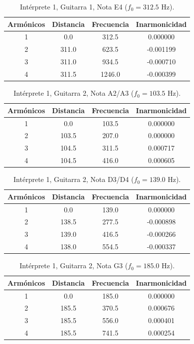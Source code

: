 \begin{table}[htbp]
  \centering
 \small
  \caption{Intérprete 1, Guitarra 1, Nota E4 ($f_0 = 312.5$ Hz).}
  \label{tab:interprete1_g1_e4}
  \begin{tabular}{cccc}
  \toprule
  Armónicos & Distancia & Frecuencia & Inarmonicidad \\
  \midrule
  1 & 0.0 & 312.5 & 0.000000 \\
  2 & 311.0 & 623.5 & -0.001199 \\
  3 & 311.0 & 934.5 & -0.000710 \\
  4 & 311.5 & 1246.0 & -0.000399 \\
  \bottomrule
  \end{tabular}
\end{table}

\begin{table}[htbp]
  \centering
 \small
  \caption{Intérprete 1, Guitarra 2, Nota A2/A3 ($f_0 = 103.5$ Hz).}
  \label{tab:interprete1_g2_a2_a3}
  \begin{tabular}{cccc}
  \toprule
  Armónicos & Distancia & Frecuencia & Inarmonicidad \\
  \midrule
  1 & 0.0 & 103.5 & 0.000000 \\
  2 & 103.5 & 207.0 & 0.000000 \\
  3 & 104.5 & 311.5 & 0.000717 \\
  4 & 104.5 & 416.0 & 0.000605 \\
  \bottomrule
  \end{tabular}
\end{table}

\begin{table}[htbp]
  \centering
 \small
  \caption{Intérprete 1, Guitarra 2, Nota D3/D4 ($f_0 = 139.0$ Hz).}
  \label{tab:interprete1_g2_d3_d4}
  \begin{tabular}{cccc}
  \toprule
  Armónicos & Distancia & Frecuencia & Inarmonicidad \\
  \midrule
  1 & 0.0 & 139.0 & 0.000000 \\
  2 & 138.5 & 277.5 & -0.000898 \\
  3 & 139.0 & 416.5 & -0.000266 \\
  4 & 138.0 & 554.5 & -0.000337 \\
  \bottomrule
  \end{tabular}
\end{table}

\begin{table}[htbp]
  \centering
 \small
  \caption{Intérprete 1, Guitarra 2, Nota G3 ($f_0 = 185.0$ Hz).}
  \label{tab:interprete1_g2_g3}
  \begin{tabular}{cccc}
  \toprule
  Armónicos & Distancia & Frecuencia & Inarmonicidad \\
  \midrule
  1 & 0.0 & 185.0 & 0.000000 \\
  2 & 185.5 & 370.5 & 0.000676 \\
  3 & 185.5 & 556.0 & 0.000401 \\
  4 & 185.5 & 741.5 & 0.000254 \\
  \bottomrule
  \end{tabular}
\end{table}

